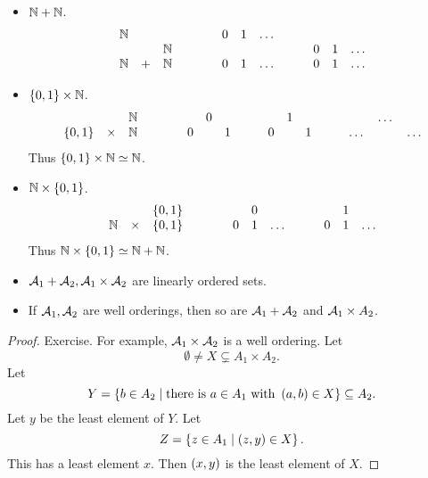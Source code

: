 \begin{example*}
\hfill
\begin{itemize}
\item $ \N + \N $.
$$
\begin{array}{ccccccccccc}
\N & & & \qquad & 0 & 1 & \dots & \quad & & & \\
& & \N & \qquad & & & & \quad & 0 & 1 & \dots \\
\N & + & \N & \qquad & 0 & 1 & \dots & \quad & 0 & 1 & \dots
\end{array}
$$
\item $ \cb{0, 1} \times \N $.
$$
\begin{array}{ccccccccccccccc}
& & \N & \qquad & & 0 & & \quad & & 1 & & \quad & & \dots & \\
\cb{0, 1} & \times & \N & \qquad & 0 & & 1 & \quad & 0 & & 1 & \quad & \dots & & \dots
\end{array}
$$
Thus $ \cb{0, 1} \times \N \simeq \N $.
\item $ \N \times \cb{0, 1} $.
$$
\begin{array}{ccccccccccc}
& & \cb{0, 1} & \qquad & & 0 & & \quad & & 1 & \\
\N & \times & \cb{0, 1} & \qquad & 0 & 1 & \dots & \quad & 0 & 1 & \dots
\end{array}
$$
Thus $ \N \times \cb{0, 1} \simeq \N + \N $.
\end{itemize}
\end{example*}

\pagebreak

\begin{lemma}
\hfill
\begin{itemize}
\item $ \AA_1 + \AA_2, \AA_1 \times \AA_2 $ are linearly ordered sets.
\item If $ \AA_1, \AA_2 $ are well orderings, then so are $ \AA_1 + \AA_2 $ and $ \AA_1 \times A_2 $.
\end{itemize}
\end{lemma}

\begin{proof}
Exercise. For example, $ \AA_1 \times \AA_2 $ is a well ordering. Let
$$ \emptyset \ne X \subsetneq A_1 \times A_2. $$
Let
$$ Y = \cb{b \in A_2 \mid \text{there is} \ a \in A_1 \ \text{with} \ \rb{a, b} \in X} \subseteq A_2. $$
Let $ y $ be the least element of $ Y $. Let
$$ Z = \cb{z \in A_1 \mid \rb{z, y} \in X}. $$
This has a least element $ x $. Then $ \rb{x, y} $ is the least element of $ X $.
\end{proof}


